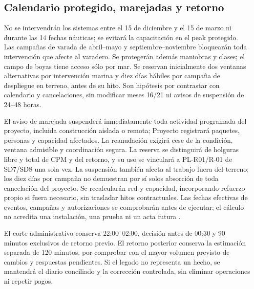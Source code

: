 

\subsection{Calendario protegido, marejadas y retorno}
No se intervendrán los sistemas entre el 15 de diciembre y el 15 de marzo ni durante las 14 fechas náuticas; se evitará la capacitación en el peak protegido. Las campañas de varada de abril--mayo y septiembre--noviembre bloquearán toda intervención que afecte al varadero. Se protegerán además maniobras y clases; el campo de boyas tiene acceso sólo por mar. Se reservan inicialmente dos ventanas alternativas por intervención marina y diez días hábiles por campaña de despliegue en terreno, antes de su hito. Son hipótesis por contrastar con calendario y cancelaciones, sin modificar meses 16/21 ni avisos de suspensión de 24--48 horas.

El aviso de marejada suspenderá inmediatamente toda actividad programada del proyecto, incluida construcción aislada o remota; Proyecto registrará paquetes, personas y capacidad afectados. La reanudación exigirá cese de la condición, ventana admisible y coordinación segura. La reserva se distinguirá de holguras libre y total de CPM y del retorno, y su uso se vinculará a PL-R01/R-01 de SD7/SD8 una sola vez. La suspensión también afecta al trabajo fuera del terreno; los diez días por campaña no demuestran por sí solos absorción de toda cancelación del proyecto. Se recalcularán red y capacidad, incorporando refuerzo propio si fuera necesario, sin trasladar hitos contractuales. Las fechas efectivas de eventos, campañas y autorizaciones se comprobarán antes de ejecutar; el cálculo no acredita una instalación, una prueba ni un acta futura \parencite[cap.~10, restricción 12, p.~26; numeral 13.2, p.~29; cap.~15, RT-10.05, p.~34]{caso07}.

El corte administrativo conserva 22:00--02:00, decisión antes de 00:30 y 90 minutos exclusivos de retorno previo. El retorno posterior conserva la estimación separada de 120 minutos, por comprobar con el mayor volumen previsto de cambios y respuestas pendientes. Si el legado no representa un hecho, se mantendrá el diario conciliado y la corrección controlada, sin eliminar operaciones ni repetir pagos.


